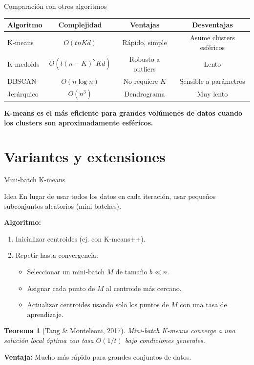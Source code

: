 \documentclass[aspectratio=169]{beamer}
\newtheorem{teorema}{Teorema}
\begin{document}
\begin{frame}{Comparación con otros algoritmos}
    \begin{table}
        \centering
        \begin{tabular}{|l|c|c|c|}
            \hline
            \textbf{Algoritmo} & \textbf{Complejidad} & \textbf{Ventajas} & \textbf{Desventajas} \\
            \hline
            K-means & \(O(t n K d)\) & Rápido, simple & Asume clusters esféricos \\
            K-medoids & \(O(t (n-K)^2 K d)\) & Robusto a outliers & Lento \\
            DBSCAN & \(O(n \log n)\) & No requiere \(K\) & Sensible a parámetros \\
            Jerárquico & \(O(n^3)\) & Dendrograma & Muy lento \\
            \hline
        \end{tabular}
    \end{table}
    
    \textbf{K-means es el más eficiente para grandes volúmenes de datos cuando los clusters son aproximadamente esféricos.}
\end{frame}

\section{Variantes y extensiones}

\begin{frame}{Mini-batch K-means}
    \begin{block}{Idea}
        En lugar de usar todos los datos en cada iteración, usar pequeños subconjuntos aleatorios (mini-batches).
    \end{block}
    
    \textbf{Algoritmo:}
    \begin{enumerate}
        \item Inicializar centroides (ej. con K-means++).
        \item Repetir hasta convergencia:
        \begin{itemize}
            \item Seleccionar un mini-batch \(M\) de tamaño \(b \ll n\).
            \item Asignar cada punto de \(M\) al centroide más cercano.
            \item Actualizar centroides usando solo los puntos de \(M\) con una tasa de aprendizaje.
        \end{itemize}
    \end{enumerate}
    
    \begin{teorema}[Tang \& Monteleoni, 2017]
        Mini-batch K-means converge a una solución local óptima con tasa \(O(1/t)\) bajo condiciones generales.
    \end{teorema}
    
    \textbf{Ventaja:} Mucho más rápido para grandes conjuntos de datos.
\end{frame}
\end{document}
